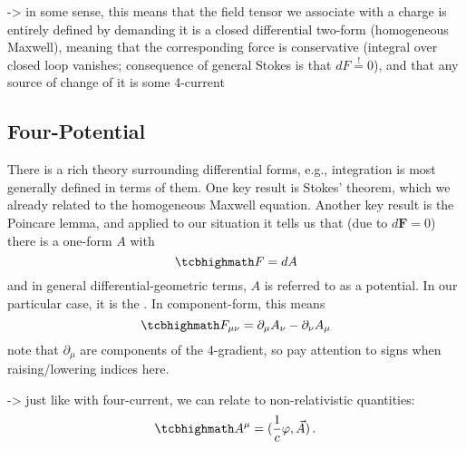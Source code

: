 \documentclass[../relativity_main.tex]{subfiles}
\begin{document}
-> in some sense, this means that the field tensor we associate with a charge is entirely defined by demanding it is a closed differential two-form (homogeneous Maxwell), meaning that the corresponding force is conservative (integral over closed loop vanishes; consequence of general Stokes is that $dF \overset{!}{=} 0$), and that any source of change of it is some 4-current 



		\subsection{Four-Potential}
There is a rich theory surrounding differential forms, e.g., integration is most generally defined in terms of them. One key result is Stokes' theorem, which we already related to the homogeneous Maxwell equation. Another key result is the Poincare lemma, and applied to our situation it tells us that (due to $d\mathbf{F} = 0$) there is a one-form $A$ with
\begin{equation}\label{eq:em_field_tensor_four_potential}
	\eqbox{
		F = dA
	}
\end{equation}
and in general differential-geometric terms, $A$ is referred to as a potential. In our particular case, it is the . In component-form, this means
\begin{equation}\label{eq:em_field_tensor_four_potential_components}
	\eqbox{
		F_{\mu \nu} = \partial_\mu A_\nu - \partial_\nu A_\mu
	}
\end{equation}
note that $\partial_\mu$ are components of the 4-gradient, so pay attention to signs when raising/lowering indices here.

-> just like with four-current, we can relate to non-relativistic quantities:
\begin{equation}\label{eq:em_four_potential_components}
	\eqbox{
		A^\mu = (\frac{1}{c} \varphi, \vec{A})
	} \, .
\end{equation}
\end{document}
